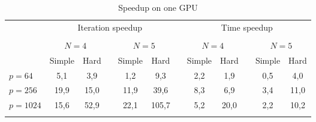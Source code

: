 \documentclass{svproc}
\begin{document}
\begin{table}
                \caption{Speedup on one GPU}
                \label{table:average_AS_GPU}
                \center
                \begin{tabular}{lccccccccccc}
																& \multicolumn{5}{c}{ Iteration speedup} & & \multicolumn{5}{c}{ Time speedup}\\
                               \noalign{\smallskip} \cline{2-6} \cline{8-12}  \\
                               & \multicolumn{2}{c}{ $N=4$ } & & \multicolumn{2}{c}{$N=5$} &  & \multicolumn{2}{c}{ $N=4$ } & & \multicolumn{2}{c}{$N=5$} \\
                               \noalign{\smallskip} \cline{2-3} \cline{5-6}  \cline{8-9} \cline{11-12} \noalign{\smallskip}
                               & Simple & Hard & & Simple & Hard &  & Simple & Hard & & Simple & Hard  \\
                               \noalign{\smallskip} \hline \noalign{\smallskip}                               
                               $p=64$  &    5,1  & 3,9  &   & 1,2 	 & 9,3   &   & 2,2	& 1,9	     &   & 0,5	& 4,0  \\
                               $p=256$ &    19,9 & 15,0 &   & 11,9 	 & 39,6  &   & 8,3	& 6,9	     &   & 3,4	& 11,0 \\
							   $p=1024$&    15,6 & 52,9 &   & 22,1	 & 105,7 &   & 5,2	& 20,0      &   & 2,2	& 10,2 \\
                               \noalign{\smallskip}\hline
                \end{tabular}
\end{table}
\end{document}

